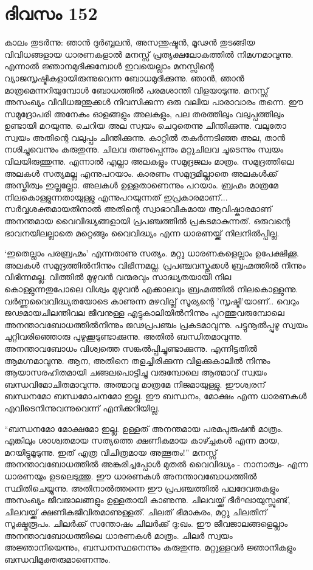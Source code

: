 \section{ദിവസം 152}


കാലം തുടർന്നു: ഞാൻ ദുർബ്ബലൻ, അസന്തുഷ്ടൻ, മൂഢൻ തുടങ്ങിയ വിവിധങ്ങളായ ധാരണകളാൽ മനസ്സ് പ്രത്യക്ഷലോകത്തിൽ നിമഗ്നമാവുന്നു. എന്നാൽ ജ്ഞാനമുദിക്കുമ്പോൾ ഇവയെല്ലാം മനസ്സിന്റെ വ്യാജസൃഷ്ടികളായിരുന്നുവെന്ന ബോധമുദിക്കുന്നു. ഞാൻ, ഞാൻ മാത്രമെന്നറിയുമ്പോൾ ബോധത്തിൽ പരമശാന്തി വിളയാടുന്നു. മനസ്സ് അസംഖ്യം വിവിധജന്തുക്കൾ നിവസിക്കുന്ന ഒരു വലിയ പാരാവാരം തന്നെ. ഈ സമുദ്രോപരി അനേകം ഓളങ്ങളും അലകളും, പല തരത്തിലും വലുപ്പത്തിലും ഉണ്ടായി മറയുന്നു. ചെറിയ അല സ്വയം ചെറുതെന്നു ചിന്തിക്കുന്നു. വലുതോ സ്വയം അതിന്റെ വലുപ്പം ചിന്തിക്കുന്നു. കാറ്റിൽ തകർന്നടിഞ്ഞ അല, താൻ നശിച്ചുവെന്നും കരുതുന്നു. ചിലവ തണുപ്പെന്നും മറ്റുചിലവ ചൂടെന്നും സ്വയം വിലയിരുത്തുന്നു. എന്നാൽ എല്ലാ അലകളും സമുദ്രജലം മാത്രം. സമുദ്രത്തിലെ അലകൾ സത്യമല്ല എന്നുപറയാം. കാരണം സമുദ്രമില്ലാതെ അലകൾക്ക് അസ്തിത്വം ഇല്ലല്ലോ. അലകൾ ഉള്ളതാണെന്നും പറയാം. ബ്രഹ്മം മാത്രമേ നിലകൊള്ളുന്നതായുള്ളു എന്നുപറയുന്നത് ഇപ്രകാരമാണ്‌... സർവ്വശക്തമായതിനാൽ അതിന്റെ സ്വാഭാവീകമായ ആവിഷ്കാരമാണ്‌ അനന്തമായ വൈവിദ്ധ്യങ്ങളായി പ്രപഞ്ചത്തിൽ പ്രകടമാകുന്നത്. ഒരുവന്റെ ഭാവനയിലല്ലാതെ മറ്റെങ്ങും വൈവിദ്ധ്യം എന്ന ധാരണയ്ക്ക്‌ നിലനിൽപ്പില്ല.

‘ഇതെല്ലാം പരബ്രഹ്മം’ എന്നതാണു സത്യം. മറ്റു ധാരണകളെല്ലാം ഉപേക്ഷിക്കൂ. അലകൾ സമുദ്രത്തിൽനിന്നും വിഭിന്നമല്ല. പ്രപഞ്ചവസ്തുക്കൾ ബ്രഹ്മത്തിൽ നിന്നും വിഭിന്നമല്ല. വിത്തിൽ മുഴുവൻ വന്മരവും സാദ്ധ്യതയായി നില കൊള്ളുന്നതുപോലെ വിശ്വം മുഴുവൻ എക്കാലവും ബ്രഹ്മത്തിൽ നിലകൊള്ളുന്നു. വർണ്ണവൈവിദ്ധ്യതയോടെ കാണുന്ന മഴവില്ല് സൂര്യന്റെ 'സൃഷ്ടി'യാണ്‌.. വെറും ജഢമായചിലന്തിവല ജീവനുള്ള എട്ടുകാലിയിൽനിന്നും പുറത്തുവരുമ്പോലെ അനന്താവബോധത്തിൽനിന്നും ജഢപ്രപഞ്ചം പ്രകടമാവുന്നു. പട്ടുനൂൽപ്പുഴു സ്വയം ചുറ്റിവരിഞ്ഞൊരു പുഴുക്കൂടുണ്ടാക്കുന്നു. അതിൽ ബന്ധിതമാവുന്നു. അനന്താവബോധം വിശ്വത്തെ സങ്കൽപ്പിച്ചുണ്ടാക്കുന്നു. എന്നിട്ടതിൽ ആമഗ്നമാവുന്നു. ആന, അതിനെ തളച്ചിരിക്കുന്ന വിളക്കുകാലിൽ നിന്നും ആയാസരഹിതമായി ചങ്ങലപൊട്ടിച്ചു വരുമ്പോലെ ആത്മാവ് സ്വയം ബന്ധവിമോചിതമാവുന്നു. അത്മാവു മാത്രമേ നിജമായുള്ളു. ഈശ്വരന്‌ ബന്ധനമോ ബന്ധമോചനമോ ഇല്ല. ഈ ബന്ധനം, മോക്ഷം എന്ന ധാരണകൾ എവിടെനിന്നുവന്നുവെന്ന് എനിക്കറിയില്ല.

“ബന്ധനമോ മോക്ഷമോ ഇല്ല. ഉള്ളത് അനന്തമായ പരമപുരുഷൻ മാത്രം. എങ്കിലും ശാശ്വതമായ സത്യത്തെ ക്ഷണികമായ കാഴ്ച്ചകൾ എന്ന മായ, മറയിട്ടുമൂടുന്നു. ഇത് എത്ര വിചിത്രമായ അത്ഭുതം!” മനസ്സ് അനന്താവബോധത്തിൽ അങ്കുരിച്ചപ്പോൾ മുതൽ വൈവിദ്ധ്യം - നാനാത്വം- എന്ന ധാരണയും ഉടലെടുത്തു. ഈ ധാരണകൾ അനന്താവബോധത്തിൽ സ്ഥിതിചെയ്യുന്നു. അതിനാൽത്തന്നെ ഈ പ്രപഞ്ചത്തിൽ പലദേവതകളും അസംഖ്യം ജീവജാലങ്ങളും ഉള്ളതായി കാണുന്നു. ചിലവയ്ക്ക് ദീർഘായുസ്സുണ്ട്, ചിലവയ്ക്ക് ക്ഷണികജീവിതമാണുള്ളത്. ചിലത് ഭീമാകരം, മറ്റു ചിലതിന്‌ സൂക്ഷ്മരൂപം. ചിലർക്ക് സന്തോഷം ചിലർക്ക് ദു:ഖം. ഈ ജീവജാലങ്ങളെല്ലാം അനന്താവബോധത്തിലെ ധാരണകൾ മാത്രം. ചിലർ സ്വയം അജ്ഞാനിയെന്നും, ബന്ധനസ്ഥനെന്നും കരുതുന്നു. മറ്റുള്ളവർ ജ്ഞാനികളും ബന്ധവിമുക്തരുമാണെന്നും.

